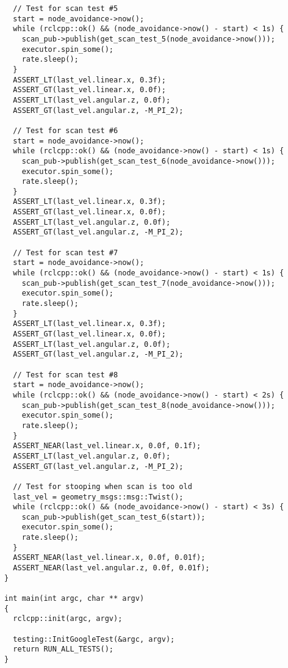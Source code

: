 \begin{tcolorbox}[sharp corners, colframe=gray!80, colback=LightGray, left=0pt, top=0pt, bottom=0pt, title=\texttt{br2\_vff\_avoidance/tests/vff\_test.cpp}]
\begin{verbatim}
  // Test for scan test #5
  start = node_avoidance->now();
  while (rclcpp::ok() && (node_avoidance->now() - start) < 1s) {
    scan_pub->publish(get_scan_test_5(node_avoidance->now()));
    executor.spin_some();
    rate.sleep();
  }
  ASSERT_LT(last_vel.linear.x, 0.3f);
  ASSERT_GT(last_vel.linear.x, 0.0f);
  ASSERT_LT(last_vel.angular.z, 0.0f);
  ASSERT_GT(last_vel.angular.z, -M_PI_2);

  // Test for scan test #6
  start = node_avoidance->now();
  while (rclcpp::ok() && (node_avoidance->now() - start) < 1s) {
    scan_pub->publish(get_scan_test_6(node_avoidance->now()));
    executor.spin_some();
    rate.sleep();
  }
  ASSERT_LT(last_vel.linear.x, 0.3f);
  ASSERT_GT(last_vel.linear.x, 0.0f);
  ASSERT_LT(last_vel.angular.z, 0.0f);
  ASSERT_GT(last_vel.angular.z, -M_PI_2);

  // Test for scan test #7
  start = node_avoidance->now();
  while (rclcpp::ok() && (node_avoidance->now() - start) < 1s) {
    scan_pub->publish(get_scan_test_7(node_avoidance->now()));
    executor.spin_some();
    rate.sleep();
  }
  ASSERT_LT(last_vel.linear.x, 0.3f);
  ASSERT_GT(last_vel.linear.x, 0.0f);
  ASSERT_LT(last_vel.angular.z, 0.0f);
  ASSERT_GT(last_vel.angular.z, -M_PI_2);

  // Test for scan test #8
  start = node_avoidance->now();
  while (rclcpp::ok() && (node_avoidance->now() - start) < 2s) {
    scan_pub->publish(get_scan_test_8(node_avoidance->now()));
    executor.spin_some();
    rate.sleep();
  }
  ASSERT_NEAR(last_vel.linear.x, 0.0f, 0.1f);
  ASSERT_LT(last_vel.angular.z, 0.0f);
  ASSERT_GT(last_vel.angular.z, -M_PI_2);

  // Test for stooping when scan is too old
  last_vel = geometry_msgs::msg::Twist();
  while (rclcpp::ok() && (node_avoidance->now() - start) < 3s) {
    scan_pub->publish(get_scan_test_6(start));
    executor.spin_some();
    rate.sleep();
  }
  ASSERT_NEAR(last_vel.linear.x, 0.0f, 0.01f);
  ASSERT_NEAR(last_vel.angular.z, 0.0f, 0.01f);
}

int main(int argc, char ** argv)
{
  rclcpp::init(argc, argv);

  testing::InitGoogleTest(&argc, argv);
  return RUN_ALL_TESTS();
}
    \end{verbatim}
    \end{tcolorbox}
  \normalsize

